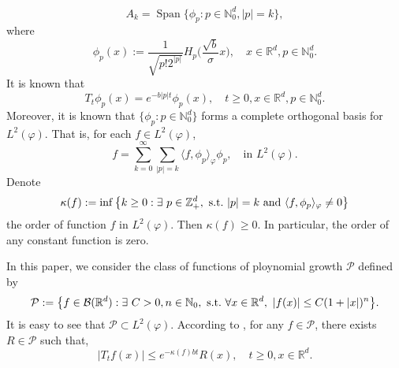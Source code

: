 \documentclass[12pt, a4paper]{amsart}
\theoremstyle{definition}
\numberwithin{equation}{section}
\begin{document}
\begin{equation}
    A_k
    = \operatorname{Span} \{\phi_p : p\in \mathbb N_0^d, |p|=k\},
\end{equation}
where
\begin{equation}\label{eigenfunction}
	\phi_p(x)
    := \frac{1}{\sqrt{ p! 2^{|p|} }} H_p \Big(\frac{ \sqrt{b} }{\sigma}x \Big),
    \quad x\in \mathbb{R}^d, p\in \mathbb N_0^d.
\end{equation}
 It is known that
\begin{equation}\label{semigroupformula}
    T_t\phi_p(x)
    =e^{-b|p|t}\phi_p(x),
    \quad t\geq 0, x\in \mathbb{R}^d, p\in \mathbb N_0^d.
\end{equation}
    Moreover, it is known that $\{\phi_p: p \in \mathbb N_0^d\}$ forms a complete orthogonal basis for $L^2(\varphi)$.
    That is, for each $f\in L^2(\varphi)$,
\begin{equation}\label{semicomp1}
    f
    =\sum_{k=0}^{\infty}\sum_{|p|=k}\langle f, \phi_p \rangle_{\varphi} \phi_p,
    \quad \text{in~} L^2(\varphi).
\end{equation}
    Denote
\begin{equation}\label{order}
    \kappa(f)
    :=\inf \left \{k\geq 0: \exists ~ p\in \mathbb{Z}_+^d,{\rm ~s.t.~}|p|=k {\rm ~and~}  \langle f, \phi_p \rangle_{\varphi}\neq 0\right \}
\end{equation}
    the order of function $f$ in $L^2(\varphi)$. 
    Then $ \kappa(f)\geq 0$. 
    In particular, the order of any constant function is zero.

    In this paper, we consider the class of functions of ploynomial growth $\mathcal{P}$ defined by
\begin{equation}
    \mathcal{P}
    :=\big \{f\in \mathcal{B}(\mathbb{R}^d):\exists~ C>0, n \in \mathbb N_0, {\rm ~s.t.~} \forall x\in \mathbb{R}^d,~ |f(x)|\leq C(1+|x|)^n\big\}.
\end{equation}
    It is easy to see that $\mathcal{P} \subset L^2(\varphi)$.
    According to \cite[Fact 1.2]{MM}, for any $f \in \mathcal{P}$, there exists $R \in \mathcal{P}$ such that,
\begin{equation}
\label{eq:semigroupineq}
    |T_tf(x)| 
    \leq e^{-\kappa(f)bt} R(x),
    \quad t\geq 0, x\in \mathbb R^d.
\end{equation}
\end{document}
